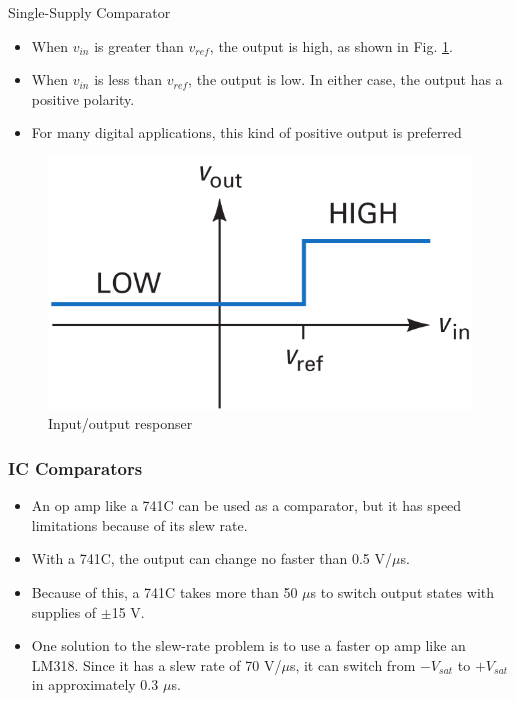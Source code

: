 \documentclass[pdflatex,compress]{beamer}
\begin{document}
\begin{frame}{Single-Supply Comparator}
	\begin{multicols}{2}
		\begin{itemize}
			\item When $v_{in}$ is greater than $v_{ref}$, the output is high, as shown in Fig. \ref{fig:2012b}.
			\item When $v_{in}$ is less than $v_{ref}$, the output is low. In either case, the output has a positive polarity.
			\item For many digital applications, this kind of positive output is preferred
		\end{itemize}
		\vfill\null
		\columnbreak
		\begin{figure}
			\centering
			\includegraphics[width=\linewidth]{img/2012b}
			\caption{Input/output responser}
			\label{fig:2012b}
		\end{figure}
	\end{multicols}
\end{frame}

\begin{frame}
	\frametitle{IC Comparators}
	\begin{itemize}
		\item An op amp like a 741C can be used as a comparator, but it has speed limitations
		because of its slew rate.
		\item With a 741C, the output can change no faster than 0.5 V/$\mu$s.
		\item Because of this, a 741C takes more than 50 $\mu$s to switch output states with
		supplies of $\pm$15 V.
		\item One solution to the slew-rate problem is to use a faster op amp like an LM318.
		Since it has a slew rate of 70 V/$\mu$s, it can switch from $-V_{sat}$ to $+V_{sat}$ in approximately 0.3 $\mu$s.
	\end{itemize}
\end{frame}
\end{document}
